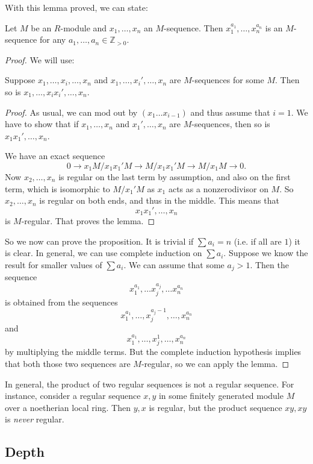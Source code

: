 With this lemma proved, we can state:
\begin{proposition} 
\label{powregseq}
Let $M$ be an $R$-module and $x_1, \dots, x_n$ an $M$-sequence. Then $x_1^{a_1}
,\dots, x_n^{a_n}$ is an $M$-sequence for any $a_1, \dots, a_n \in
\mathbb{Z}_{>0}$.
\end{proposition} 

\begin{proof}
We will use:
\begin{lemma} 
Suppose $x_1, \dots, x_i, \dots, x_n$ and $x_1, \dots, x_i', \dots, x_n$ are
$M$-sequences for some $M$. Then so is $x_1, \dots, x_i x_i', \dots, x_n$.
\end{lemma} 

\begin{proof} 
As usual, we can mod out by $(x_1 \dots x_{i-1})$ and thus assume that $i=1$.
We have to show that if $x_1, \dots, x_n$ and $x_1', \dots, x_n$ are
$M$-sequences, then so is $x_1 x_1', \dots, x_n$.

We have an exact sequence
\[ 0 \to x_1 M/x_1 x_1' M \to M/x_1 x_1' M \to  M/x_1  M \to 0.  \]
Now $x_2, \dots, x_n$ is regular  on the last term by assumption, and also on
the first term, which is isomorphic to $M/x_1' M$ as $x_1$ acts as a
nonzerodivisor on $M$. So $x_2, \dots, x_n$ is regular on both ends, and thus
in the middle. This means that 
\[ x_1 x_1', \dots, x_n  \]
is $M$-regular. That proves the lemma. 
\end{proof} 

So we now can prove the proposition. It is trivial if $\sum a_i = n$ (i.e. if
all are $1$) it is clear. In general, we can use complete induction on $\sum
a_i$. Suppose we know the result for smaller values of $\sum a_i$. We can
assume that some $a_j >1$. 
Then  the sequence
\[ x_1^{a_1}, \dots x_j^{a_j} , \dots x_n^{a_n} \]
is obtained from the sequences
\[  x_1^{a_1}, \dots,x_j^{a_j - 1}, \dots, x_n^{a_n} \]
and
\[  x_1^{a_1}, \dots,x_j^{1}, \dots, x_n^{a_n} \]
by multiplying the middle terms. But the complete induction hypothesis implies
that both those two sequences are $M$-regular, so we can apply the lemma. 
\end{proof} 

In general, the product of two regular sequences is not a regular sequence. For
instance, consider a regular sequence $x,y$ in some finitely generated module $M$ over a
noetherian local ring. Then $y,x$ is regular, but the product sequence $xy, xy$
is \emph{never} regular.


\subsection{Depth}

